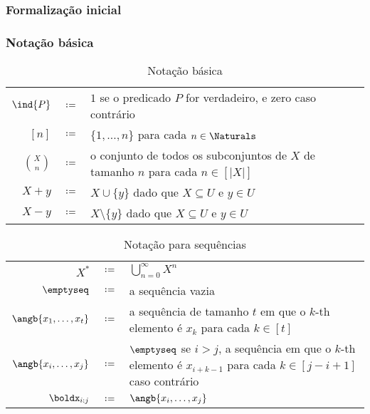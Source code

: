 \subsubsection{Formalização inicial}

\subsubsection{Notação básica}

\bgroup
	\renewcommand{\arraystretch}{1.2}
	\begin{table}[htbp]
	  \caption{Notação básica}
          \label{tbl:notation}
	  \centering
	  \begin{tabular}{r c p{13cm}}
	    \toprule
            \(\ind{P}\) & \(\coloneqq\)& \(1\) se o predicado \(P\) for verdadeiro, e zero caso contrário \\
            \([n]\)
            & \(\coloneqq\)
            & \(\{1, \dotsc, n\}\) para cada \(n
              \in \Naturals\)\\
            \(\binom{X}{n}\) & \(\coloneqq\)& o conjunto de todos os subconjuntos de \(X\) de tamanho \(n\) para cada \(n \in [|X|]\) \\
            \(X + y\) & \(\coloneqq\)& \(X \cup \{y\}\) dado que \(X\subseteq U\) e \(y \in U\) \\
            \(X - y\) & \(\coloneqq\)& \(X \setminus \{y\}\) dado que \(X\subseteq U\) e \(y \in U\)\\
            \bottomrule
	  \end{tabular}
	\end{table}
\egroup


\bgroup
	\renewcommand{\arraystretch}{1.2}
	\begin{table}[htbp]
	  \caption{Notação para sequências}
          \label{tbl:seq_notation}
	  \centering
	  \begin{tabular}{r c p{13cm}}
	    \toprule
            \(X^*\)
            &\(\coloneqq\)
            & \(\bigcup_{n = 0}^\infty X^n\)\\
            \(\emptyseq\)
            & \(\coloneqq\)
            & a sequência vazia\\
            \(\angb{x_1, \dotsc, x_t}\)
            & \(\coloneqq\)
            & a sequência de tamanho \(t\) em que o \(k\)-th
              elemento é \(x_k\) para cada \(k \in [t]\) \\
            \(\angb{x_i, \dotsc, x_j}\)
            & \(\coloneqq\)
            & \(\emptyseq\) se \(i > j\), a sequência em que o \(k\)-th elemento
              é \(x_{i + k -1}\) para cada \(k \in [j - i + 1]\)
              caso contrário\\
            \(\boldx_{i:j}\)
            & \(\coloneqq\)
            & \(\angb{x_i, \dotsc, x_j}\)\\
            \bottomrule
	  \end{tabular}
	\end{table}
\egroup


